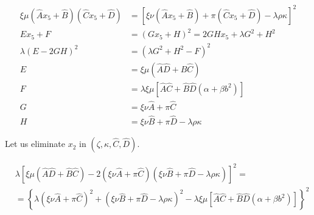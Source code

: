 \begin{align}
\xi \mu (\hat A x_5 + \hat B)(\hat C x_5 + \hat D)  &= \left[ \xi\nu (\hat A x_5 + \hat B)  + \pi (\hat C x_5 + \hat D) - \lambda \rho \kappa \right]^2 \\
E x_5 + F  &= ( G x_5 + H )^2 = 2GH x_5 + \lambda G^2 + H^2 \\
\lambda (E - 2GH)^2  &= \left(\lambda G^2 + H^2 - F\right)^2 \\
E &= \xi \mu(\hat A\hat D + \hat B\hat C)\\
F &= \lambda \xi \mu [\hat A\hat C + \hat B\hat D(\alpha + \beta b^2)] \\
G &= \xi \nu \hat A + \pi \hat C \\
H &= \xi \nu \hat B + \pi \hat D - \lambda \rho \kappa
\end{align}

Let us eliminate $x_2$ in $(\zeta,\kappa, \hat C, \hat D)$.

\footnotesize

\begin{align}
&\lambda \left[\xi \mu(\hat A\hat D + \hat B\hat C) - 2\left(\xi \nu \hat A + \pi \hat C\right) \left(\xi \nu \hat B + \pi \hat D - \lambda \rho \kappa\right) \right]^2 = \nonumber\\
&= \left\{\lambda \left(\xi \nu \hat A + \pi \hat C\right)^2 + \left(\xi \nu \hat B   + \pi \hat D - \lambda \rho \kappa\right) ^2 - \lambda \xi \mu [\hat A\hat C + \hat B\hat D(\alpha + \beta b^2)]\right\}^2 
\end{align}

\normalsize

